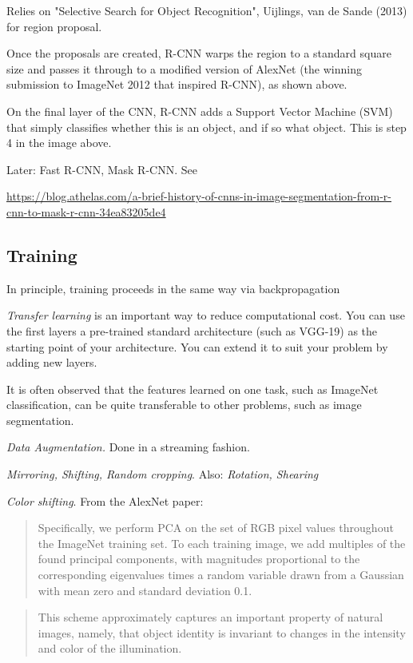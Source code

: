 \documentclass[english]{article}
\begin{document}
Relies on "Selective Search for Object Recognition", Uijlings, van de Sande (2013) for region proposal.

Once the proposals are created, R-CNN warps the region to a standard square size and passes it through to a modified version of AlexNet (the winning submission to ImageNet 2012 that inspired R-CNN), as shown above.

On the final layer of the CNN, R-CNN adds a Support Vector Machine (SVM) that simply classifies whether this is an object, and if so what object. This is step 4 in the image above.

Later: Fast R-CNN, Mask R-CNN. See  

\url{https://blog.athelas.com/a-brief-history-of-cnns-in-image-segmentation-from-r-cnn-to-mask-r-cnn-34ea83205de4}
\eenum

\subsection{Training}
\benum
\item In principle, training proceeds in the same way via backpropagation
\item \emph{Transfer learning} is an important way to reduce computational cost. You can use the first layers a pre-trained standard architecture (such as VGG-19) as the starting point of your architecture. You can extend it to suit your problem by adding new layers. 

It is often observed that the features learned on one task, such as ImageNet classification, can be quite transferable to other problems, such as image segmentation. 

\item \emph{Data Augmentation.} Done in a streaming fashion. 

\emph{Mirroring, Shifting, Random cropping}. Also: \emph{Rotation, Shearing}

\emph{Color shifting}. From the AlexNet paper: 


\begin{quote}
Specifically, we perform PCA on the set of RGB pixel values throughout the
ImageNet training set. To each training image, we add multiples of the found principal components,
with magnitudes proportional to the corresponding eigenvalues times a random variable drawn from
a Gaussian with mean zero and standard deviation 0.1.
\end{quote}


\begin{quote}
This scheme approximately captures an important property of natural images,
namely, that object identity is invariant to changes in the intensity and color of the illumination.
\end{quote}
\eenum
\end{document}
